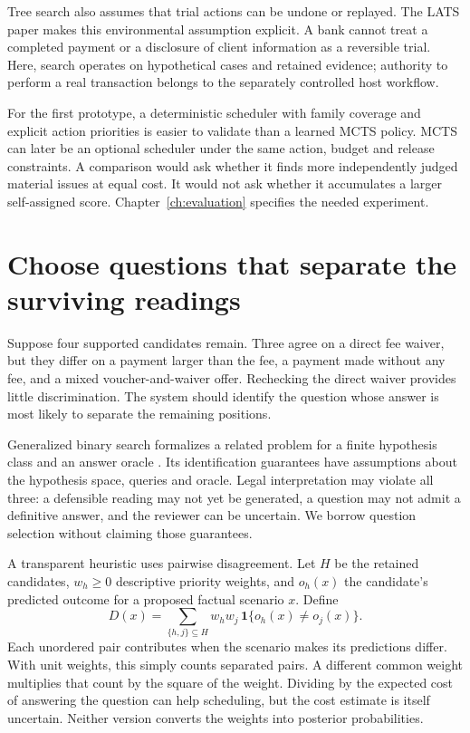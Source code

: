 Tree search also assumes that trial actions can be undone or replayed.
The LATS paper makes this environmental assumption explicit. A bank
cannot treat a completed payment or a disclosure of client information
as a reversible trial. Here, search operates on hypothetical cases and
retained evidence; authority to perform a real transaction belongs to
the separately controlled host workflow.

For the first prototype, a deterministic scheduler with family coverage and
explicit action priorities is easier to validate than a learned MCTS policy.
MCTS can later be an optional scheduler under the same action, budget and release
constraints. A comparison would ask whether it finds more independently judged
material issues at equal cost. It would not ask whether it accumulates a larger
self-assigned score. Chapter~\ref{ch:evaluation} specifies the needed experiment.

\section{Choose questions that separate the surviving readings}
\label{merge:M05:08}


Suppose four supported candidates remain. Three agree on a direct fee waiver,
but they differ on a payment larger than the fee, a payment made without any fee,
and a mixed voucher-and-waiver offer. Rechecking the direct waiver provides
little discrimination. The system should identify the question whose answer is
most likely to separate the remaining positions.

Generalized binary search formalizes a related problem for a finite hypothesis
class and an answer oracle \citep[Figure 1 and sections I--II]{gbs2011}. Its
identification guarantees have assumptions about the hypothesis space, queries
and oracle. Legal interpretation may violate all three: a defensible reading may
not yet be generated, a question may not admit a definitive answer, and the
reviewer can be uncertain. We borrow question selection without claiming those
guarantees.


A transparent heuristic uses pairwise disagreement. Let $H$ be the retained
candidates, $w_h\geq0$ descriptive priority weights, and $o_h(x)$ the candidate's
predicted outcome for a proposed factual scenario $x$. Define
\begin{equation}
 D(x)=\sum_{\{h,j\}\subseteq H}w_h w_j\,
       \mathbf{1}\{o_h(x)\ne o_j(x)\}.
 \label{eq:disagreement-question}
\end{equation}
Each unordered pair contributes when the scenario makes its predictions differ.
With unit weights, this simply counts separated pairs. A different common
weight multiplies that count by the square of the weight. Dividing by the expected
cost of answering the question can help scheduling, but the cost estimate is
itself uncertain. Neither version converts the weights into posterior
probabilities.

